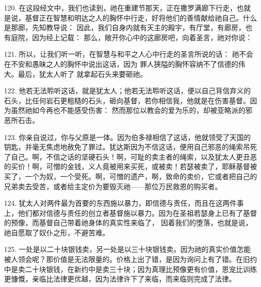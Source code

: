 120. 在这段经文中，我们也读到，祂在重建节那天，正在撒罗满廊下行走，也就是说，基督正在智慧和明达之人的胸怀中行走，好将他们的善情献给祂自己。什么是那廊，先知教导说： 因此，我们自身内就有天主的殿宇，有厅堂，有廊房，也有庭院，因为经上记载：  那么，敞开你心中的这廊房吧，向着圣言，祂对你说：\par

121. 所以，让我们听一听，在智慧与和平之人心中行走的圣言所说的话：  祂不会在不安和愚昧之人的胸怀中说出这话，因为  罪人狭隘的胸怀容纳不了信德的伟大。最后，犹太人听了  就拿起石头来要砸祂。\par

122. 他若无法聆听这话，就是犹太人；他若无法聆听这话，便以自己背信弃义的石头，比任何岩石更粗糙的石头，砸向基督，若你相信我，他就是在伤害基督。因为虽然祂如今再也不能感受伤害：  然而那位以教会的爱为乐的，却被亚略派的邪恶所石击。\par

123.  你亲自说过，你与父原是一体。因为伯多禄相信了这话，他就领受了天国的钥匙，并毫无焦虑地赦免了罪过。犹达斯因为不信这话，便用自己邪恶的绳索吊死了自己。啊，不信之话的坚硬石头！啊，可耻的卖主者的绳索，以及犹太人更丑恶的买价！啊，可憎的金钱，义人竟被用来买死，或被卖！若瑟被卖了，耶稣基督被买了，一个为奴，一个受死。啊，可憎的遗产，啊，致命的卖价，它或者把自己的兄弟卖去受苦，或者给主定价为要毁灭祂——那位万民救恩的购买者。\par

124. 犹太人对两件最为首要的东西施以暴力，即信德与责任，而且在这两件事上，他们都对信德与责任的创立者基督施以暴力。因为在圣祖若瑟身上已有了基督的预像，而基督自己带着祂身体的真实性来临了，  因着我们的堕落，也就是说，祂自愿取了奴仆之形，不避苦难。\par

125. 一处是以二十块银钱卖，另一处是以三十块银钱卖。因为祂的真实价值怎能被人领会呢？那价值是无法限量的。价格上出了错，是因为询问上有了错。在旧约中是卖二十块银钱，在新约中是卖三十块；因为真理比预像更有价值，恩宠比训练更慷慨，亲临比法律更优越，因为法律许下了来临，而来临则完成了法律。\par

